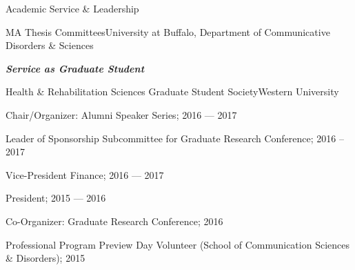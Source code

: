\documentclass{resume} %
\begin{document}
\begin{rSection}{Academic Service \& Leadership}
\begin{rSubsection}{MA Thesis Committees}{}{University at Buffalo, Department of Communicative Disorders \& Sciences}{}
\bigskip
\begin{center}
	{\bf \emph{Service as Graduate Student}}\\
\end{center}

\begin{rSubsection}{Health \& Rehabilitation Sciences Graduate Student Society}{}{Western University}{}
	\item Chair/Organizer: Alumni Speaker Series; 2016 --- 2017
	\item Leader of Sponsorship Subcommittee for Graduate Research Conference; 2016 --2017
	\item Vice-President Finance; 2016 --- 2017
	\item President; 2015 --- 2016
	\item Co-Organizer: Graduate Research Conference; 2016
	\item Professional Program Preview Day Volunteer (School of Communication Sciences \& Disorders); 2015
\end{rSubsection}

%	
%	
%	
%	
%	
%	



\end{rSubsection}
\end{rSection}
\end{document}
